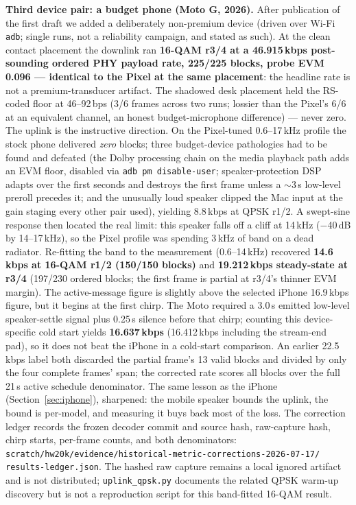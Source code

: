 \documentclass[11pt]{article}
\begin{document}
\textbf{Third device pair: a budget phone (Moto G, 2026).} After
publication of the first draft we added a deliberately non-premium device
(driven over Wi-Fi \texttt{adb}; single runs, not a reliability campaign,
and stated as such). At the clean contact placement the downlink ran
\textbf{16-QAM r3/4 at a 46.915\,kbps post-sounding ordered PHY payload rate,
225/225 blocks, probe EVM 0.096 ---
identical to the Pixel at the same placement}: the headline rate is not a
premium-transducer artifact. The shadowed desk placement held the RS-coded
floor at 46--92\,bps (3/6 frames across two runs; lossier than the Pixel's
6/6 at an equivalent channel, an honest budget-microphone difference) ---
never zero. The uplink is the instructive direction. On the Pixel-tuned
0.6--17\,kHz profile the stock phone delivered \emph{zero} blocks; three
budget-device pathologies had to be found and defeated (the Dolby
processing chain on the media playback path adds an EVM floor, disabled
via \texttt{adb pm disable-user}; speaker-protection DSP adapts over the
first seconds and destroys the first frame unless a $\sim$3\,s low-level
preroll precedes it; and the unusually loud speaker clipped the Mac input
at the gain staging every other pair used), yielding 8.8\,kbps at QPSK
r1/2. A swept-sine response then located the real limit: this speaker
falls off a cliff at 14\,kHz ($-$40\,dB by 14--17\,kHz), so the Pixel
profile was spending 3\,kHz of band on a dead radiator. Re-fitting the
band to the measurement (0.6--14\,kHz) recovered \textbf{14.6\,kbps at
16-QAM r1/2 (150/150 blocks)} and \textbf{19.212\,kbps steady-state at r3/4}
(197/230 ordered blocks; the first frame is partial at r3/4's thinner EVM
margin). The active-message figure is slightly above the selected iPhone
16.9\,kbps figure, but it begins at the first chirp. The Moto required a
3.0\,s emitted low-level speaker-settle signal plus 0.25\,s silence before that
chirp; counting this device-specific cold start yields \textbf{16.637\,kbps}
(16.412\,kbps including the stream-end pad), so it does not beat the iPhone in
a cold-start comparison. An
earlier 22.5\,kbps label both discarded the partial frame's 13 valid blocks
and divided by only the four complete frames' span; the corrected rate scores
all blocks over the full 21\,s active schedule denominator. The
same lesson as the iPhone (Section~\ref{sec:iphone}), sharpened: the
mobile speaker bounds the uplink, the bound is per-model, and measuring
it buys back most of the loss. The correction ledger records the frozen decoder
commit and source hash, raw-capture hash, chirp starts, per-frame counts, and
both denominators:
\texttt{scratch/hw20k/evidence/historical-metric-corrections-2026-07-17/}
\texttt{results-ledger.json}. The hashed raw capture remains a local ignored
artifact and is not distributed; \texttt{uplink\_qpsk.py} documents the related
QPSK warm-up discovery but is not a reproduction script for this band-fitted
16-QAM result.
\end{document}

